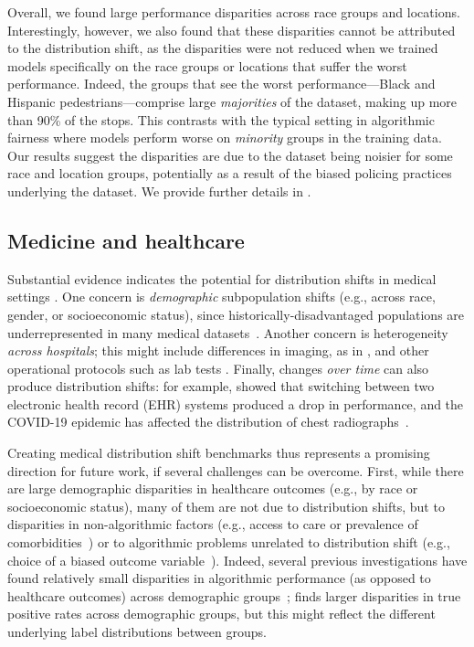 Overall, we found large performance disparities across race groups and locations. Interestingly, however, we also found that these disparities cannot be attributed to the distribution shift, as the disparities were not reduced when we trained models specifically on the race groups or locations that suffer the worst performance.
Indeed, the groups that see the worst performance---Black and Hispanic pedestrians---comprise large \emph{majorities} of the dataset, making up  more than 90\% of the stops. This contrasts with the typical setting in algorithmic fairness where models perform worse on \emph{minority} groups in the training data.
Our results suggest the disparities are due to the dataset being noisier for some race and location groups, potentially as a result of the biased policing practices underlying the dataset. We provide further details in .

\subsection{Medicine and healthcare}
Substantial evidence indicates the potential for distribution shifts in medical settings \citep{finlayson2021clinician}. One concern is \emph{demographic} subpopulation shifts (e.g., across race, gender, or socioeconomic status), since historically-disadvantaged populations are underrepresented in many medical datasets~\citep{chen2020ethical}.
Another concern is heterogeneity \emph{across hospitals}; this might include differences in imaging, as in , and other operational protocols such as lab tests \citep{damour2020underspecification, subbaswamy2020evaluating}.
Finally, changes \emph{over time} can also produce distribution shifts: for example, \citet{nestor2019feature} showed that switching between two electronic health record (EHR) systems produced a drop in performance,
and the COVID-19 epidemic has affected the distribution of chest radiographs~\citep{wong2020frequency}.

Creating medical distribution shift benchmarks thus represents a promising direction for future work, if several challenges can be overcome. First, while there are large demographic disparities in healthcare outcomes (e.g., by race or socioeconomic status), many of them are not due to distribution shifts, but to disparities in non-algorithmic factors (e.g., access to care or prevalence of comorbidities~\citep{chen2020ethical}) or to algorithmic problems unrelated to distribution shift (e.g., choice of a biased outcome variable~\citep{obermeyer2019dissecting}).
Indeed, several previous investigations have found relatively small disparities in algorithmic performance (as opposed to healthcare outcomes) across demographic groups~\citep{chen2019can, larrazabal2020gender}; \citet{seyyed2020chexclusion} finds larger disparities in true positive rates across demographic groups, but this might reflect the different underlying label distributions between groups.

